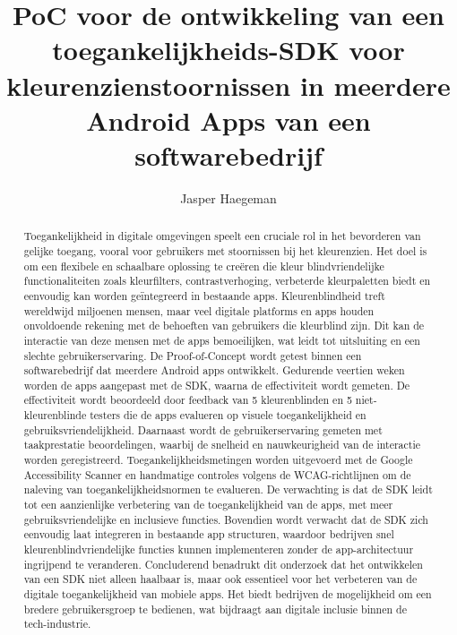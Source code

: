 \documentclass{hogent-article}
\title{PoC voor de ontwikkeling van een toegankelijkheids-SDK voor kleurenzienstoornissen in meerdere Android Apps van een softwarebedrijf}
\author{Jasper Haegeman}
\begin{document}
\begin{abstract}
 Toegankelijkheid in digitale omgevingen speelt een cruciale rol in het bevorderen van gelijke 
 toegang, vooral voor gebruikers met stoornissen bij het kleurenzien. Het doel is om een flexibele 
 en schaalbare oplossing te creëren die kleur blindvriendelijke functionaliteiten zoals kleurfilters,
  contrastverhoging, verbeterde kleurpaletten biedt en eenvoudig kan worden geïntegreerd in 
  bestaande apps. Kleurenblindheid treft wereldwijd miljoenen mensen, maar veel digitale platforms
   en apps houden onvoldoende rekening met de behoeften van gebruikers die kleurblind zijn. 
   Dit kan de interactie van deze mensen met de apps bemoeilijken, wat leidt tot uitsluiting en 
   een slechte gebruikerservaring. De Proof-of-Concept wordt getest binnen een softwarebedrijf dat 
   meerdere Android apps ontwikkelt. Gedurende veertien weken worden de apps aangepast met de SDK, 
   waarna de effectiviteit wordt gemeten. De effectiviteit wordt beoordeeld door feedback van 
   5 kleurenblinden en 5 niet-kleurenblinde testers die de apps evalueren op visuele toegankelijkheid 
   en gebruiksvriendelijkheid. Daarnaast wordt de gebruikerservaring gemeten met taakprestatie 
   beoordelingen, waarbij de snelheid en nauwkeurigheid van de interactie worden geregistreerd. 
   Toegankelijkheidsmetingen worden uitgevoerd met de Google Accessibility Scanner en handmatige 
   controles volgens de WCAG-richtlijnen om de naleving van toegankelijkheidsnormen te evalueren. 
   De verwachting is dat de SDK leidt tot een aanzienlijke verbetering van de toegankelijkheid van 
   de apps, met meer gebruiksvriendelijke en inclusieve functies. Bovendien wordt verwacht dat de 
   SDK zich eenvoudig laat integreren in bestaande app structuren, waardoor bedrijven snel 
   kleurenblindvriendelijke functies kunnen implementeren zonder de app-architectuur ingrijpend 
   te veranderen. Concluderend benadrukt dit onderzoek dat het ontwikkelen van een SDK niet alleen 
   haalbaar is, maar ook essentieel voor het verbeteren van de digitale toegankelijkheid van 
   mobiele apps. Het biedt bedrijven de mogelijkheid om een bredere gebruikersgroep te bedienen, 
   wat bijdraagt aan digitale inclusie binnen de tech-industrie.
\end{abstract}

\tableofcontents



\printbibliography[heading=bibintoc]
\end{document}
